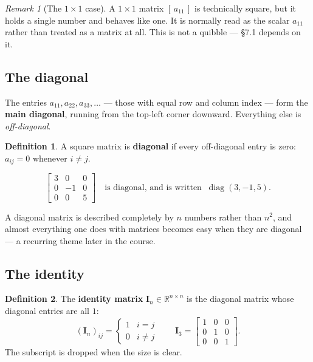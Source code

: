 \documentclass[11pt]{article}
\theoremstyle{plain}
\theoremstyle{definition}
\newtheorem{defn}{Definition}[section]
\theoremstyle{remark}
\newtheorem*{rmk}{Remark}
\newcommand{\R}{\mathbb{R}}
\newcommand{\mt}[1]{\mathbf{#1}}        %
\DeclareMathOperator{\diagop}{diag}
\begin{document}
\begin{rmk}[The $1\times1$ case]
A $1\times1$ matrix $[\,a_{11}\,]$ is technically square, but it holds a single
number and behaves like one. It is normally read as the scalar $a_{11}$ rather
than treated as a matrix at all. This is not a quibble --- \S7.1 depends on it.
\end{rmk}

\subsection{The diagonal}
The entries $a_{11},a_{22},a_{33},\dots$ --- those with equal row and column
index --- form the \textbf{main diagonal}, running from the top-left corner
downward. Everything else is \emph{off-diagonal}.

\begin{defn}
A square matrix is \textbf{diagonal} if every off-diagonal entry is zero:
$a_{ij}=0$ whenever $i\neq j$.
\end{defn}

\[
  \begin{bmatrix}3&0&0\\0&-1&0\\0&0&5\end{bmatrix}
  \quad\text{is diagonal, and is written }\ \diagop(3,-1,5).
\]

\noindent A diagonal matrix is described completely by $n$ numbers rather than
$n^{2}$, and almost everything one does with matrices becomes easy when they are
diagonal --- a recurring theme later in the course.

\subsection{The identity}
\begin{defn}
The \textbf{identity matrix} $\mt{I}_n\in\R^{n\times n}$ is the diagonal matrix
whose diagonal entries are all $1$:
\[
  (\mt{I}_n)_{ij}=\begin{cases}1&i=j\\0&i\neq j\end{cases}
  \qquad
  \mt{I}_3=\begin{bmatrix}1&0&0\\0&1&0\\0&0&1\end{bmatrix} .
\]
The subscript is dropped when the size is clear.
\end{defn}
\end{document}
